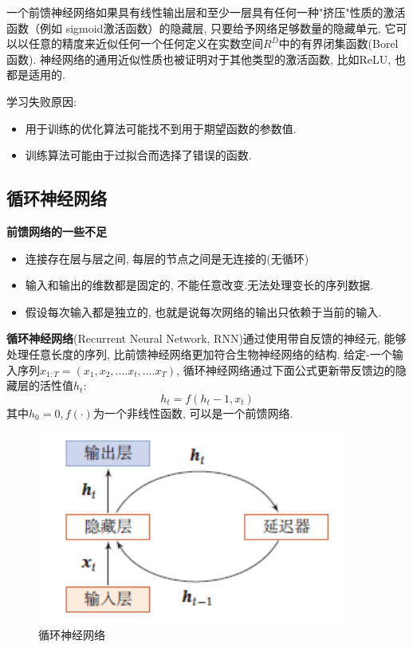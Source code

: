 \documentclass[a4paper]{article}
\theoremstyle{definition}
\numberwithin{equation}{section}
\begin{document}
一个前馈神经网络如果具有线性输出层和至少一层具有任何一种"挤压"性质的激活函数（例如 sigmoid激活函数）的隐藏层, 只要给予网络足够数量的隐藏单元, 它可以以任意的精度来近似任何一个任何定义在实数空间$ R^D$中的有界闭集函数(Borel 函数). 神经网络的通用近似性质也被证明对于其他类型的激活函数, 比如ReLU, 也都是适用的.

学习失败原因:
\begin{itemize}
    \item 用于训练的优化算法可能找不到用于期望函数的参数值.
    \item 训练算法可能由于过拟合而选择了错误的函数.
\end{itemize}
\subsection{循环神经网络}

\textbf{前馈网络的一些不足}
\begin{itemize}
    \item 连接存在层与层之间, 每层的节点之间是无连接的(无循环)
    \item 输入和输出的维数都是固定的, 不能任意改变.无法处理变长的序列数据.
    \item 假设每次输入都是独立的, 也就是说每次网络的输出只依赖于当前的输入.
\end{itemize}

\textbf{循环神经网络}(Recurrent Neural Network, RNN)通过使用带自反馈的神经元, 能够处理任意长度的序列, 比前馈神经网络更加符合生物神经网络的结构.
给定-一个输入序列$x_{1:T} =(x_1, x_2,  .... x_t, .... x_T)$, 循环神经网络通过下面公式更新带反馈边的隐藏层的活性值$h_t$:
$$h_t= f(h_t-1, x_t)$$
其中$h_0= 0, f( \cdot )$为一个非线性函数, 可以是一个前馈网络.
\begin{figure}[!htb]
    \center
\includegraphics[width=0.9\textwidth]{RNN_sample.png}
\caption{循环神经网络}
\end{figure}
\end{document}
